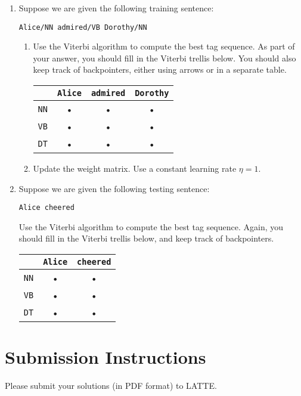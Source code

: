 \documentclass[11pt,letterpaper]{article}
\begin{document}
\begin{enumerate}

\item Suppose we are given the following training sentence:

\texttt{Alice/NN admired/VB Dorothy/NN}

\begin{enumerate}

\item Use the Viterbi algorithm to compute the best tag sequence. As part of your answer, you should fill in the Viterbi trellis below. You should also keep track of backpointers, either using arrows or in a separate table.
\begin{center}
\begin{tabular}{|c|c|c|c|}
\hline 
& \texttt{Alice} & \texttt{admired} & \texttt{Dorothy} \\ 
\hline 
\texttt{NN} & • & • & • \\ 
\hline 
\texttt{VB} & • & • & • \\ 
\hline 
\texttt{DT} & • & • & • \\ 
\hline 
\end{tabular} 
\end{center}

\vspace{11pt}

\item Update the weight matrix. Use a constant learning rate $\eta=1$.

\end{enumerate}\newpage

\item Suppose we are given the following testing sentence:

\texttt{Alice cheered}

\noindent Use the Viterbi algorithm to compute the best tag sequence. Again, you should fill in the Viterbi trellis below, and keep track of backpointers.
\begin{center}
\begin{tabular}{|c|c|c|}
\hline 
& \texttt{Alice} & \texttt{cheered} \\ 
\hline 
\texttt{NN} & • & • \\ 
\hline 
\texttt{VB} & • & • \\ 
\hline 
\texttt{DT} & • & • \\ 
\hline 
\end{tabular} 
\end{center}

\end{enumerate}

\section*{Submission Instructions}

Please submit your solutions (in PDF format) to LATTE.
\end{document}
